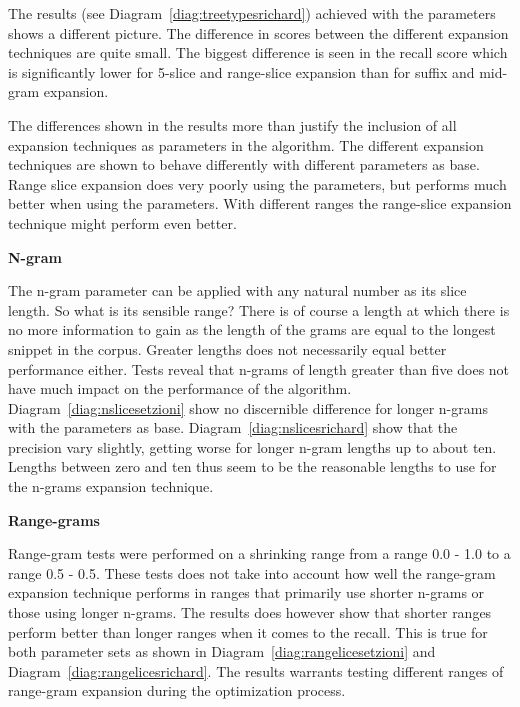 The results (see Diagram~\ref{diag:treetypesrichard}) achieved with the \citeauthor{Moe2013} parameters shows a different picture. The difference in scores between the different expansion techniques are quite small. The biggest difference is seen in the recall score which is significantly lower for 5-slice and range-slice expansion than for suffix and mid-gram expansion.

The differences shown in the results more than justify the inclusion of all expansion techniques as parameters in the algorithm. The different expansion techniques are shown to behave differently with different parameters as base. Range slice expansion does very poorly using the \citeauthor{Oren1998} parameters, but performs much better when using the \citeauthor{Moe2013} parameters. With different ranges the range-slice expansion technique might perform even better.

\textbf{N-gram}

The n-gram parameter can be applied with any natural number as its slice length. So what is its sensible range? There is of course a length at which there is no more information to gain as the length of the grams are equal to the longest snippet in the corpus. Greater lengths does not necessarily equal better performance either. Tests reveal that n-grams of length greater than five does not have much impact on the performance of the algorithm. Diagram~\ref{diag:nslicesetzioni} show no discernible difference for longer n-grams with the \citeauthor{Oren1998} parameters as base. Diagram~\ref{diag:nslicesrichard} show that the precision vary slightly, getting worse for longer n-gram lengths up to about ten. Lengths between zero and ten thus seem to be the reasonable lengths to use for the n-grams expansion technique.

\textbf{Range-grams}

Range-gram tests were performed on a shrinking range from a range 0.0 - 1.0 to a range 0.5 - 0.5. These tests does not take into account how well the range-gram expansion technique performs in ranges that primarily use shorter n-grams or those using longer n-grams. The results does however show that shorter ranges perform better than longer ranges when it comes to the recall. This is true for both parameter sets as shown in Diagram~\ref{diag:rangelicesetzioni} and Diagram~\ref{diag:rangelicesrichard}. The results warrants testing different ranges of range-gram expansion during the optimization process.

